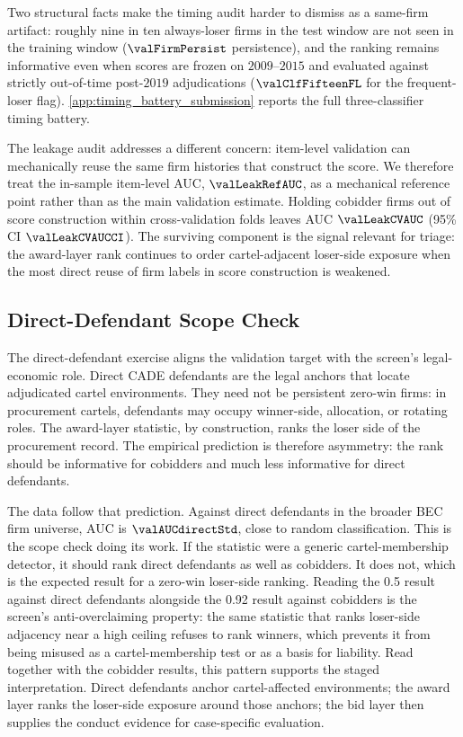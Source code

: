 Two structural facts make the timing audit harder to dismiss as
a same-firm artifact: roughly nine in ten always-loser firms in
the test window are not seen in the training window
($\valFirmPersist$ persistence), and the ranking remains
informative even when scores are frozen on $2009$--$2015$ and
evaluated against strictly out-of-time post-$2019$ adjudications
($\valClfFifteenFL$ for the frequent-loser flag).
\ref{app:timing_battery_submission} reports the full
three-classifier timing battery.

The leakage audit addresses a different concern: item-level
validation can mechanically reuse the same firm histories that
construct the score. We therefore treat the in-sample item-level
AUC, $\valLeakRefAUC$, as a mechanical reference point rather
than as the main validation estimate. Holding cobidder firms out
of score construction within cross-validation folds leaves AUC
$\valLeakCVAUC$ (95\% CI $\valLeakCVAUCCI$). The surviving
component is the signal relevant for triage: the award-layer
rank continues to order cartel-adjacent loser-side exposure when
the most direct reuse of firm labels in score construction is
weakened.

\subsection{Direct-Defendant Scope Check}
\label{sec:validation_direct}

The direct-defendant exercise aligns the validation target with
the screen's legal-economic role. Direct CADE defendants are the
legal anchors that locate adjudicated cartel environments. They
need not be persistent zero-win firms: in procurement cartels,
defendants may occupy winner-side, allocation, or rotating roles.
The award-layer statistic, by construction, ranks the loser side
of the procurement record. The empirical prediction is therefore
asymmetry: the rank should be informative for cobidders and much
less informative for direct defendants.

The data follow that prediction. Against direct defendants in
the broader BEC firm universe, AUC is $\valAUCdirectStd$, close
to random classification. This is the scope check doing its
work. If the statistic were a generic cartel-membership detector,
it should rank direct defendants as well as cobidders. It does
not, which is the expected result for a zero-win loser-side
ranking. Reading the 0.5 result against direct defendants
alongside the 0.92 result against cobidders is the screen's
anti-overclaiming property: the same statistic that ranks
loser-side adjacency near a high ceiling refuses to rank winners,
which prevents it from being misused as a cartel-membership test
or as a basis for liability. Read together with the cobidder
results, this pattern supports the staged interpretation. Direct defendants anchor
cartel-affected environments; the award layer ranks the
loser-side exposure around those anchors; the bid layer then
supplies the conduct evidence for case-specific evaluation.

